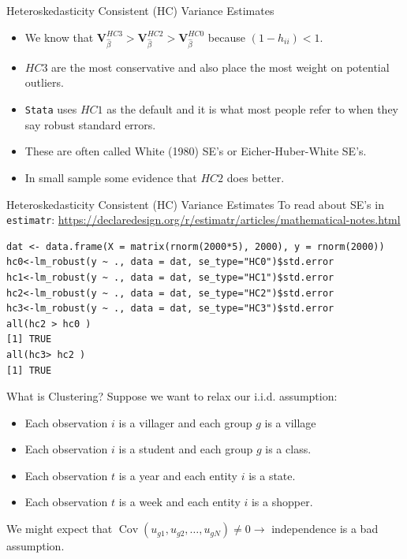 \documentclass[aspectratio=169]{beamer}
\begin{document}
\begin{frame}{Heteroskedasticity Consistent (HC) Variance Estimates}
\begin{itemize}
\item We know that $\mathbf{V}_{\widehat{\beta}}^{HC3} > \mathbf{V}_{\widehat{\beta}}^{HC2} > \mathbf{V}_{\widehat{\beta}}^{HC0}$ because $(1- h_{ii}) <1$.
\item $HC3$ are the most \alert{conservative} and also place the most weight on potential outliers.
\item \texttt{Stata} uses $HC1$ as the default and it is what most people refer to when they say \alert{robust standard errors}.
\item These are often called White (1980) SE's or Eicher-Huber-White SE's.
\item In small sample some evidence that $HC2$ does better.
\end{itemize}
\end{frame}

\begin{frame}[fragile]{Heteroskedasticity Consistent (HC) Variance Estimates}
\footnotesize
To read about SE's in \texttt{estimatr}:
\url{ https://declaredesign.org/r/estimatr/articles/mathematical-notes.html}
\begin{verbatim}
dat <- data.frame(X = matrix(rnorm(2000*5), 2000), y = rnorm(2000))
hc0<-lm_robust(y ~ ., data = dat, se_type="HC0")$std.error
hc1<-lm_robust(y ~ ., data = dat, se_type="HC1")$std.error
hc2<-lm_robust(y ~ ., data = dat, se_type="HC2")$std.error
hc3<-lm_robust(y ~ ., data = dat, se_type="HC3")$std.error
all(hc2 > hc0 )
[1] TRUE
all(hc3> hc2 )
[1] TRUE
\end{verbatim}
\end{frame}

\begin{frame}{What is Clustering?}
Suppose we want to relax our i.i.d. assumption:
\begin{itemize}
\item Each observation $i$ is a \alert{villager} and each group $g$ is a \alert{village}
\item Each observation $i$ is a \alert{student} and each group $g$ is a \alert{class}.
\item Each observation $t$ is a \alert{year} and each entity $i$ is a \alert{state}.
\item Each observation $t$ is a \alert{week} and each entity $i$ is a \alert{shopper}.
\end{itemize}
We might expect that $\operatorname { Cov } (u_{g1},u_{g2},\ldots,u_{gN}) \neq 0 \rightarrow$ independence is a bad assumption. 
\end{frame}
\end{document}

